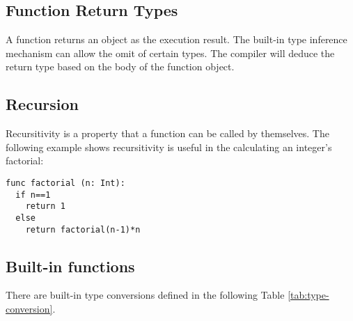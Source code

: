 \documentclass[11pt]{article}
\begin{document}
\subsection{Function Return Types}
A function returns an object as the execution result. The built-in type inference mechanism can allow the omit of certain types. The compiler will deduce the return type based on the body of the function object. 

\subsection{Recursion} 
Recursitivity is a property that a function can be called by themselves. The following example shows recursitivity is useful in the calculating an integer's factorial:
\begin{lstlisting}
func factorial (n: Int):
  if n==1
    return 1
  else
    return factorial(n-1)*n
\end{lstlisting}
\subsection{Built-in functions}
There are built-in type conversions defined in the following Table \ref{tab:type-conversion}.
\end{document}
